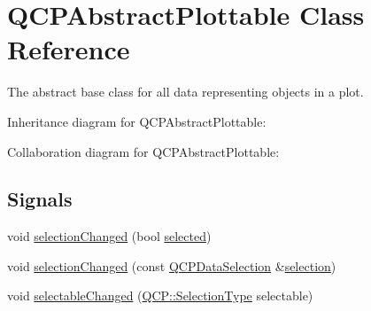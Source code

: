 \hypertarget{classQCPAbstractPlottable}{}\section{Q\+C\+P\+Abstract\+Plottable Class Reference}
\label{classQCPAbstractPlottable}


The abstract base class for all data representing objects in a plot.  




Inheritance diagram for Q\+C\+P\+Abstract\+Plottable\+:


Collaboration diagram for Q\+C\+P\+Abstract\+Plottable\+:
\subsection*{Signals}
\begin{DoxyCompactItemize}
\item 
void \hyperlink{classQCPAbstractPlottable_a3af66432b1dca93b28e00e78a8c7c1d9}{selection\+Changed} (bool \hyperlink{classQCPAbstractPlottable_a0b3b514474fe93354fc74cfc144184b4}{selected})
\item 
void \hyperlink{classQCPAbstractPlottable_a787a9c39421059006891744b731fa473}{selection\+Changed} (const \hyperlink{classQCPDataSelection}{Q\+C\+P\+Data\+Selection} \&\hyperlink{classQCPAbstractPlottable_a040bf09f41d456284cfd39cc37aa068f}{selection})
\item 
void \hyperlink{classQCPAbstractPlottable_a663b1a44123c8340ac041a29d1e2c973}{selectable\+Changed} (\hyperlink{namespaceQCP_ac6cb9db26a564b27feda362a438db038}{Q\+C\+P\+::\+Selection\+Type} selectable)
\end{DoxyCompactItemize}
